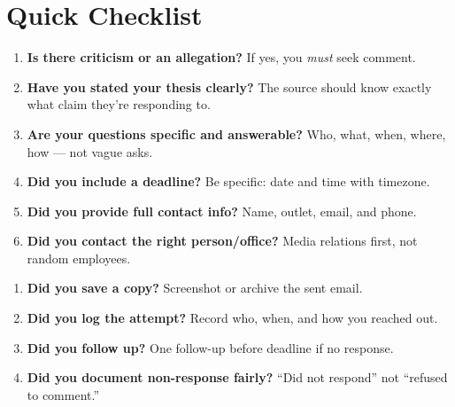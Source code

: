\documentclass[12pt]{article}
\newcommand{\key}[1]{\textbf{#1}}
\begin{document}
\section{Quick Checklist}

\begin{principalbox}
\begin{enumerate}
  \item \key{Is there criticism or an allegation?} If yes, you \emph{must} seek comment.
  \item \key{Have you stated your thesis clearly?} The source should know exactly what claim they're responding to.
  \item \key{Are your questions specific and answerable?} Who, what, when, where, how --- not vague asks.
  \item \key{Did you include a deadline?} Be specific: date and time with timezone.
  \item \key{Did you provide full contact info?} Name, outlet, email, and phone.
  \item \key{Did you contact the right person/office?} Media relations first, not random employees.
\end{enumerate}
\end{principalbox}

\begin{principalbox}
\begin{enumerate}
  \item \key{Did you save a copy?} Screenshot or archive the sent email.
  \item \key{Did you log the attempt?} Record who, when, and how you reached out.
  \item \key{Did you follow up?} One follow-up before deadline if no response.
  \item \key{Did you document non-response fairly?} ``Did not respond'' not ``refused to comment.''
\end{enumerate}
\end{principalbox}
\end{document}
